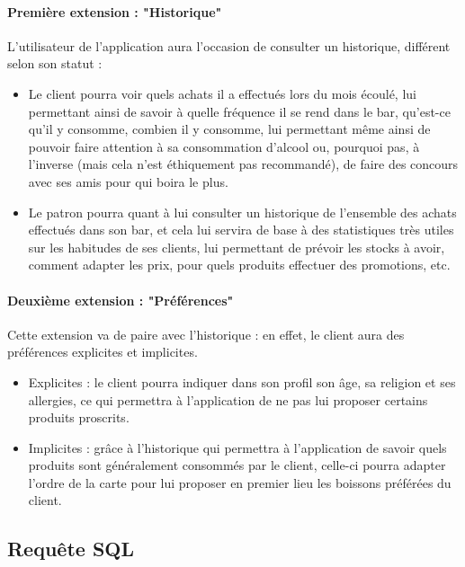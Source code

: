 \documentclass[11pt, a4, oneside, headings=normal]{scrreprt}
\begin{document}
\paragraph{Première extension : "Historique"}
L'utilisateur de l'application aura l'occasion de consulter un historique, différent selon son statut :
\begin{itemize}
\item Le client pourra voir quels achats il a effectués lors du mois écoulé, lui permettant ainsi de savoir à quelle fréquence il se rend dans le bar, qu'est-ce qu'il y consomme, combien il y consomme, lui permettant même ainsi de pouvoir faire attention à sa consommation d'alcool ou, pourquoi pas, à l'inverse (mais cela n'est éthiquement pas recommandé), de faire des concours avec ses amis pour qui boira le plus.

\item Le patron pourra quant à lui consulter un historique de l'ensemble des achats effectués dans son bar, et cela lui servira de base à des statistiques très utiles sur les habitudes de ses clients, lui permettant de prévoir les stocks à avoir, comment adapter les prix, pour quels produits effectuer des promotions, etc.
\end{itemize}

\paragraph{Deuxième extension : "Préférences"}
Cette extension va de paire avec l'historique : en effet, le client aura des préférences explicites et implicites.
\begin{itemize}
\item Explicites : le client pourra indiquer dans son profil son âge, sa religion et ses allergies, ce qui permettra à l'application de ne pas lui proposer certains produits proscrits.
\item Implicites : grâce à l'historique qui permettra à l'application de savoir quels produits sont généralement consommés par le client, celle-ci pourra adapter l'ordre de la carte pour lui proposer en premier lieu les boissons préférées du client.
\end{itemize}

\subsection*{Requête SQL}
\end{document}
